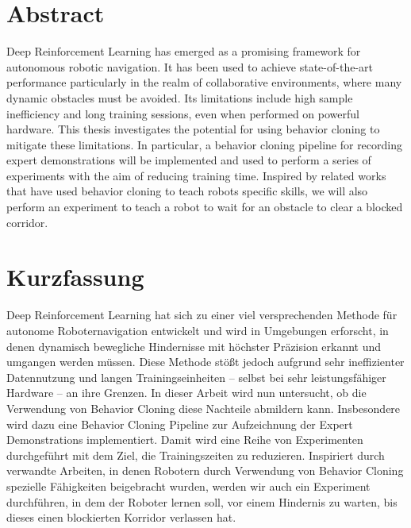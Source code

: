 \chapter*{Abstract}\label{cha:abstract}
Deep Reinforcement Learning has emerged as a promising framework for autonomous robotic navigation. It has been used to achieve state-of-the-art performance particularly in the realm of collaborative environments, where many dynamic obstacles must be avoided. Its limitations include high sample inefficiency and long training sessions, even when performed on powerful hardware. This thesis investigates the potential for using behavior cloning to mitigate these limitations. In particular, a behavior cloning pipeline for recording expert demonstrations will be implemented and used to perform a series of experiments with the aim of reducing training time.
Inspired by related works that have used behavior cloning to teach robots specific skills, we will also perform an experiment to teach a robot to wait for an obstacle to clear a blocked corridor.


\chapter*{Kurzfassung}\label{cha:abstract_german}
Deep Reinforcement Learning hat sich zu einer viel versprechenden Methode für autonome Roboternavigation entwickelt und wird in Umgebungen erforscht, in denen dynamisch bewegliche Hindernisse mit höchster Präzision erkannt und umgangen werden müssen.
Diese Methode stößt jedoch aufgrund sehr ineffizienter Datennutzung und langen Trainingseinheiten – selbst bei sehr leistungsfähiger Hardware – an ihre Grenzen.
In dieser Arbeit wird nun untersucht, ob die Verwendung von Behavior Cloning diese Nachteile abmildern kann.
Insbesondere wird dazu eine Behavior Cloning Pipeline zur Aufzeichnung der Expert Demonstrations  implementiert.
Damit wird eine Reihe von Experimenten durchgeführt mit dem Ziel, die Trainingszeiten zu reduzieren.
Inspiriert durch verwandte Arbeiten, in denen Robotern durch Verwendung von Behavior Cloning spezielle Fähigkeiten beigebracht wurden, werden wir auch ein Experiment durchführen, in dem der Roboter lernen soll, vor einem Hindernis zu warten, bis dieses einen blockierten Korridor verlassen hat.


